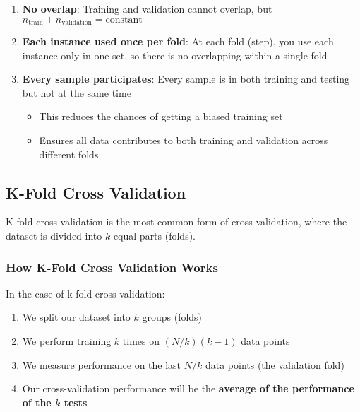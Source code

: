 \documentclass[11pt,a4paper]{article}
\theoremstyle{definition}
\theoremstyle{plain}
\theoremstyle{remark}
\begin{document}
\begin{enumerate}
    \item \textbf{No overlap}: Training and validation cannot overlap, but $n_{\text{train}} + n_{\text{validation}} = \text{constant}$
    
    \item \textbf{Each instance used once per fold}: At each fold (step), you use each instance only in one set, so there is no overlapping within a single fold
    
    \item \textbf{Every sample participates}: Every sample is in both training and testing but not at the same time
    \begin{itemize}
        \item This reduces the chances of getting a biased training set
        \item Ensures all data contributes to both training and validation across different folds
    \end{itemize}
\end{enumerate}

\subsection{K-Fold Cross Validation}

K-fold cross validation is the most common form of cross validation, where the dataset is divided into $k$ equal parts (folds).

\subsubsection{How K-Fold Cross Validation Works}

In the case of k-fold cross-validation:

\begin{enumerate}
    \item We split our dataset into $k$ groups (folds)
    
    \item We perform training $k$ times on $(N/k)(k-1)$ data points
    
    \item We measure performance on the last $N/k$ data points (the validation fold)
    
    \item Our cross-validation performance will be the \textbf{average of the performance of the $k$ tests}
\end{enumerate}
\end{document}
